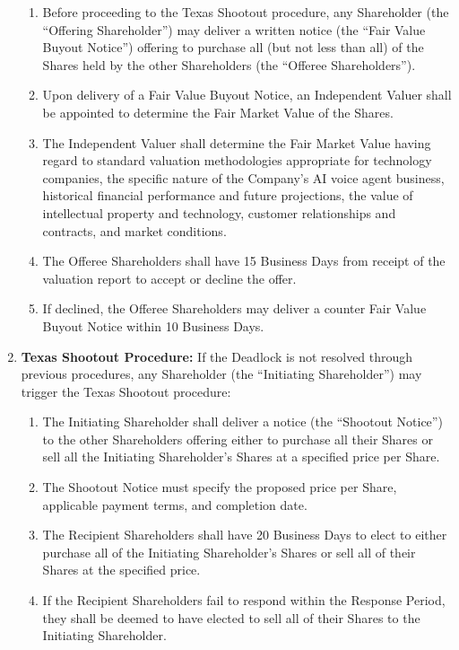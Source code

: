 \begin{enumerate}[label=(\alph*)]
    \begin{enumerate}[label=(\roman*)]
    \item Before proceeding to the Texas Shootout procedure, any Shareholder (the ``Offering Shareholder'') may deliver a written notice (the ``Fair Value Buyout Notice'') offering to purchase all (but not less than all) of the Shares held by the other Shareholders (the ``Offeree Shareholders'').
    \item Upon delivery of a Fair Value Buyout Notice, an Independent Valuer shall be appointed to determine the Fair Market Value of the Shares.
    \item The Independent Valuer shall determine the Fair Market Value having regard to standard valuation methodologies appropriate for technology companies, the specific nature of the Company's AI voice agent business, historical financial performance and future projections, the value of intellectual property and technology, customer relationships and contracts, and market conditions.
    \item The Offeree Shareholders shall have 15 Business Days from receipt of the valuation report to accept or decline the offer.
    \item If declined, the Offeree Shareholders may deliver a counter Fair Value Buyout Notice within 10 Business Days.
    \end{enumerate}
\item \textbf{Texas Shootout Procedure:} If the Deadlock is not resolved through previous procedures, any Shareholder (the ``Initiating Shareholder'') may trigger the Texas Shootout procedure:
    \begin{enumerate}[label=(\roman*)]
    \item The Initiating Shareholder shall deliver a notice (the ``Shootout Notice'') to the other Shareholders offering either to purchase all their Shares or sell all the Initiating Shareholder's Shares at a specified price per Share.
    \item The Shootout Notice must specify the proposed price per Share, applicable payment terms, and completion date.
    \item The Recipient Shareholders shall have 20 Business Days to elect to either purchase all of the Initiating Shareholder's Shares or sell all of their Shares at the specified price.
    \item If the Recipient Shareholders fail to respond within the Response Period, they shall be deemed to have elected to sell all of their Shares to the Initiating Shareholder.

\end{enumerate}
\end{enumerate}

